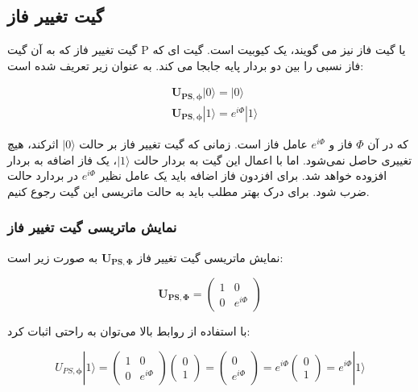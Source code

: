 \documentclass{book}
\begin{document}
\subsection*{گیت تغییر فاز}
گیت تغییر فاز که به آن گیت P یا گیت فاز نیز می گویند، یک کیوبیت است.
گیت ای که فاز نسبی را بین دو بردار پایه جابجا می کند. به عنوان زیر تعریف شده است:
\begin{center}
	\begin{equation}
		\begin{aligned}
		& \boldsymbol{U}_{\boldsymbol{PS}, \boldsymbol{\phi}}|0\rangle=|0\rangle \\
		& \boldsymbol{U}_{\boldsymbol{PS},  \boldsymbol{\phi}}|1\rangle=e^{i \Phi}|1\rangle
	\end{aligned}
\end{equation}
\end{center}


که در آن $\Phi$ فاز و $e^{i\Phi}$ عامل فاز است. 
زمانی که گیت تغییر فاز بر حالت $\vert 0 \rangle$  اثرکند، هیچ تغییری حاصل نمی‌شود. اما با اعمال این گیت به بردار حالت $\vert 1 \rangle$، یک فاز اضافه به بردار افزوده خواهد شد. برای افزدون فاز اضافه  باید یک عامل نظیر  $e^{i\Phi}$ در بردارد حالت ضرب شود. برای درک بهتر مطلب باید به حالت ماتریسی این گیت رجوع کنیم.





\subsubsection{نمایش ماتریسی گیت تغییر فاز}

نمایش ماتریسی گیت تغییر فاز $\boldsymbol{U}_{\boldsymbol{P} \boldsymbol{S}, \boldsymbol{\Phi}}$ به صورت زیر است:

\begin{center}
	$$\boldsymbol{U}_{\boldsymbol{P} \boldsymbol{S}, \boldsymbol{\Phi}}=\left(\begin{array}{cc}
		1 & 0 \\
		0 & e^{i \Phi}
	\end{array}\right)$$
\end{center}
با استفاده از روابط بالا می‌توان  به راحتی اثبات کرد: 
\begin{center}
	$$U_{P S, \boldsymbol{\phi}}|1\rangle=\left(\begin{array}{cc}
		1 & 0 \\
		0 & e^{i \Phi}
	\end{array}\right)\left(\begin{array}{l}
		0 \\
		1
	\end{array}\right)=\left(\begin{array}{c}
		0 \\
		e^{i \Phi}
	\end{array}\right)=e^{i \Phi}\left(\begin{array}{l}
		0 \\
		1
	\end{array}\right)=e^{i \Phi}|1\rangle$$
\end{center}
\end{document}
